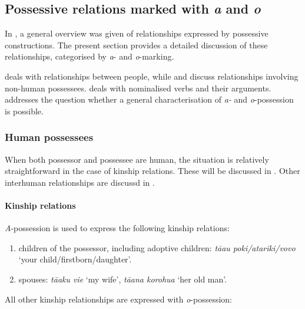 \subsection{Possessive relations marked with \textit{a} and \textit{o}}\label{sec:6.3.3}

In , a general overview was given of relationships expressed by possessive constructions. The present section provides a detailed discussion of these relationships, categorised by \textit{a}{}- and \textit{o}{}-marking.

 deals with relationships between people, while  and  discuss relationships involving non-human possessees.  deals with nominalised verbs and their arguments.  addresses the question whether a general characterisation of \textit{{\ꞌ}a-} and \textit{o}{}-possession is possible.

\subsubsection[Human possessees]{Human possessees}\label{sec:6.3.3.1}

When both possessor and possessee are human, the situation is relatively straightforward in the case of kinship relations. These will be discussed in . Other interhuman relationships are discussd in .

\paragraph[Kinship relations]{Kinship relations}\label{sec:6.3.3.1.1}
\textit{{\ꞌ}A}-possession is used to express the following kinship relations:

\begin{enumerate}
\item 
children of the possessor, including adoptive children: \textit{tā{\ꞌ}au poki/{\ꞌ}atariki/vovo} ‘your child/firstborn/daughter’.

\item 
spouses: \textit{tā{\ꞌ}aku vi{\ꞌ}e} ‘my wife’, \textit{tā{\ꞌ}ana korohu{\ꞌ}a} ‘her old man’.

\end{enumerate}

All other kinship relationships are expressed with \textit{o}{}-possession:

